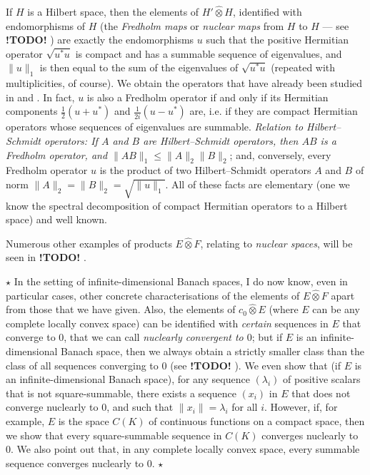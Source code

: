 \documentclass{article}
\theoremstyle{plain}
\newcommand{\aster}[1]{$\star${#1}$\star$}
\newcommand{\hotimes}{\widehat{\otimes}}
\newcommand{\todo}{\textbf{ !TODO! }}
\newcommand{\oldpage}[1]{\marginpar{\footnotesize$\Big\vert$ \textit{p.~#1}}}
\begin{document}
If $H$ is a Hilbert space, then the elements of $H'\hotimes H$, identified with endomorphisms of $H$ (the \emph{Fredholm maps} or \emph{nuclear maps} from $H$ to $H$ --- see \todo) are exactly the endomorphisms $u$ such that the positive Hermitian operator
\oldpage{81}
$\sqrt{u^*u}$ is compact and has a summable sequence of eigenvalues, and $\|u\|_1$ is then equal to the sum of the eigenvalues of $\sqrt{u^*u}$ (repeated with multiplicities, of course).
We obtain the operators that have already been studied in \cite{4} and \cite{8}.
In fact, $u$ is also a Fredholm operator if and only if its Hermitian components $\frac12(u+u^*)$ and $\frac{1}{2i}(u-u^*)$ are, i.e. if they are compact Hermitian operators whose sequences of eigenvalues are summable.
\emph{Relation to Hilbert--Schmidt operators: If $A$ and $B$ are Hilbert--Schmidt operators, then $AB$ is a Fredholm operator, and $\|AB\|_1\leq\|A\|_2\|B\|_2$};
and, conversely, every Fredholm operator $u$ is the product of two Hilbert--Schmidt operators $A$ and $B$ of norm $\|A\|_2=\|B\|_2=\sqrt{\|u\|_1}$.
All of these facts are elementary (one we know the spectral decomposition of compact Hermitian operators to a Hilbert space) and well known.

Numerous other examples of products $E\hotimes F$, relating to \emph{nuclear spaces}, will be seen in \todo.

\aster{%
  In the setting of infinite-dimensional Banach spaces, I do now know, even in particular cases, other concrete characterisations of the elements of $E\hotimes F$ apart from those that we have given.
  Also, the elements of $c_0\hotimes E$ (where $E$ can be any complete locally convex space) can be identified with \emph{certain} sequences in $E$ that converge to $0$, that we can call \emph{nuclearly convergent to $0$};
  but if $E$ is an infinite-dimensional Banach space, then we always obtain a strictly smaller class than the class of all sequences converging to $0$ (see \todo).
  We even show that (if $E$ is an infinite-dimensional Banach space), for any sequence $(\lambda_i)$ of positive scalars that is not square-summable, there exists a sequence $(x_i)$ in $E$ that does not converge nuclearly to $0$, and such that $\|x_i\|=\lambda_i$ for all $i$.
  However, if, for example, $E$ is the space $C(K)$ of continuous functions on a compact space, then we show that every square-summable sequence in $C(K)$ converges nuclearly to $0$.
  We also point out that, in any complete locally convex space, every summable sequence converges nuclearly to $0$.
}
\end{document}

